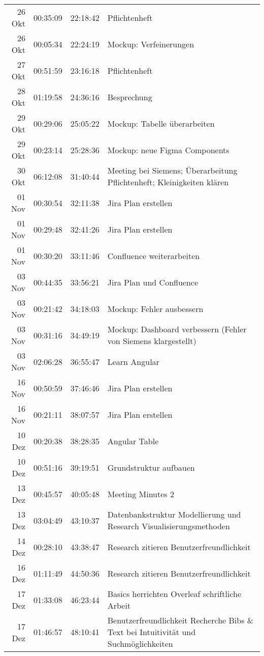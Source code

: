 \begin{longtable}{r | r | r | p{}}
	 26 Okt & 00:35:09 & 22:18:42 & Pflichtenheft \\ 
	 26 Okt & 00:05:34 & 22:24:19 & Mockup: Verfeinerungen \\ 
	 27 Okt & 00:51:59 & 23:16:18 & Pflichtenheft \\ 
	 28 Okt & 01:19:58 & 24:36:16 & Besprechung \\ 
	 29 Okt & 00:29:06 & 25:05:22 & Mockup: Tabelle überarbeiten \\ 
	 29 Okt & 00:23:14 & 25:28:36 & Mockup: neue Figma Components \\ 
	 30 Okt & 06:12:08 & 31:40:44 & Meeting bei Siemens; Überarbeitung Pflichtenheft; Kleinigkeiten klären \\ 
	 01 Nov & 00:30:54 & 32:11:38 & Jira Plan erstellen \\ 
	 01 Nov & 00:29:48 & 32:41:26 & Jira Plan erstellen \\ 
	 01 Nov & 00:30:20 & 33:11:46 & Confluence weiterarbeiten \\ 
	 03 Nov & 00:44:35 & 33:56:21 & Jira Plan und Confluence \\ 
	 03 Nov & 00:21:42 & 34:18:03 & Mockup: Fehler ausbessern \\ 
	 03 Nov & 00:31:16 & 34:49:19 & Mockup: Dashboard verbessern (Fehler von Siemens klargestellt) \\ 
	 03 Nov & 02:06:28 & 36:55:47 & Learn Angular \\ 
	 16 Nov & 00:50:59 & 37:46:46 & Jira Plan erstellen \\ 
	 16 Nov & 00:21:11 & 38:07:57 & Jira Plan erstellen \\ 
	 10 Dez & 00:20:38 & 38:28:35 & Angular Table \\ 
	 10 Dez & 00:51:16 & 39:19:51 & Grundstruktur aufbauen \\ 
	 13 Dez & 00:45:57 & 40:05:48 & Meeting Minutes 2 \\ 
	 13 Dez & 03:04:49 & 43:10:37 & Datenbankstruktur Modellierung und Research Visualisierungsmethoden \\ 
	 14 Dez & 00:28:10 & 43:38:47 & Research zitieren Benutzerfreundlichkeit \\ 
	 16 Dez & 01:11:49 & 44:50:36 & Research zitieren Benutzerfreundlichkeit \\ 
	 17 Dez & 01:33:08 & 46:23:44 & Basics herrichten Overleaf schriftliche Arbeit \\ 
	 17 Dez & 01:46:57 & 48:10:41 & Benutzerfreundlichkeit Recherche Bibs \& Text bei Intuitivität und Suchmöglichkeiten \\ 

\end{longtable}
